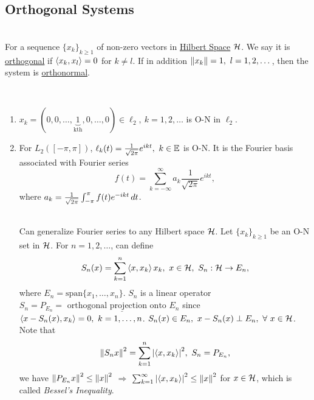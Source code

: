 \vspace{12pt}
\subsection{Orthogonal Systems}

\begin{definition}\ \\
For a sequence $\{x_k\}_{k \geq 1}$ of non-zero vectors in \underline{Hilbert Space} $\mathcal{H}$. We say it is \underline{orthogonal} if $\left\langle x_k, x_l \right\rangle = 0$ for $k \neq l$. If in addition $\norm{x_k} = 1,\ l=1,2,\dots$, then the system is \underline{orthonormal}.
\end{definition}

\begin{examples}\
\begin{enumerate}[label = (\alph*)]
    \item $x_k = (0,0,\dots,\underbrace{1}_{\text{kth}},0,\dots,0) \in \ell_2,\ k = 1,2,\dots$ is O-N in $\ell_2$.
    \item For $L_2([-\pi,\pi])$, $\ell_k (t) = \frac{1}{\sqrt{2\pi}} e^{ikt},\ k \in \E$ is O-N. It is the Fourier basis associated with Fourier series 
    $$f(t) = \sum_{k =-\infty}^\infty a_k \frac{1}{\sqrt{2\pi}} e^{ikt},$$
    where $a_k = \frac{1}{\sqrt{2\pi}} \int_{-\pi}^\pi f(t) e^{-ikt} \,dt$.
    \begin{remark}\ \\
    Can generalize Fourier series to any Hilbert space $\mathcal{H}$. Let $\{x_k\}_{k \geq 1}$ be an O-N set in $\mathcal{H}$. For $n = 1,2,\dots$, can define 
    $$S_n(x) = \sum_{k = 1}^n \left\langle x, x_k \right\rangle x_k,\ x \in \mathcal{H},\ S_n: \mathcal{H} \to E_n,$$
    where $E_n = \text{span}\{x_1,\dots,x_n\}$. $S_n$ is a linear operator $S_n = P_{E_n} = \underline{\text{ orthogonal projection onto } E_n}$ since $\left\langle x - S_n(x), x_k \right\rangle = 0,\ k = 1,\dots,n$. $S_n(x) \in E_n,\ x - S_n(x) \perp E_n,\ \forall\ x \in \mathcal{H}$. Note that
    $$\norm{S_n x}^2 = \sum_{k=1}^n \abs{\left\langle x, x_k \right\rangle}^2,\ S_n = P_{E_n},$$ 
    we have $\norm{P_{E_n}x}^2 \leq \norm{x}^2$ $\Rightarrow$ $\sum_{k = 1}^\infty \abs{\left\langle x, x_k \right\rangle}^2 \leq \norm{x}^2$ for $x \in \mathcal{H}$, which is called \textit{Bessel's Inequality}.
    \end{remark}
\end{enumerate}
\end{examples}

